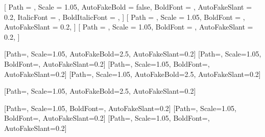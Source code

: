 \setCJKmainfont{\MySongTi}[
    Path = \fontdir,
    Scale = 1.05,
    AutoFakeBold = false,
    BoldFont = \MySongTiBold,
    AutoFakeSlant = 0.2,
    ItalicFont = \MyKaiTi,
    BoldItalicFont = \MyKaiTi,
]
\setCJKsansfont{\MyHeiTi}[
    Path = \fontdir,
    Scale = 1.05,
    BoldFont = \MyHeiTiBold,
    AutoFakeSlant = 0.2,
]
\setCJKmonofont{\MyHeiTi}[
    Path = \fontdir,
    Scale = 1.05,
    BoldFont = \MyHeiTiBold,
    AutoFakeSlant = 0.2,
]

\newCJKfontfamily\kaishu{\MyKaiTi}[Path=\fontdir, Scale=1.05, AutoFakeBold=2.5, AutoFakeSlant=0.2]
\newCJKfontfamily\songti{\MySongTi}[Path=\fontdir, Scale=1.05, BoldFont=\MySongTiBold, AutoFakeSlant=0.2]
\newCJKfontfamily\heiti{\MyHeiTi}[Path=\fontdir, Scale=1.05, BoldFont=\MyHeiTiBold, AutoFakeSlant=0.2]
\newCJKfontfamily\fangsong{\MyFangSong}[Path=\fontdir, Scale=1.05, AutoFakeBold=2.5, AutoFakeSlant=0.2]

\newCJKfontfamily{}[Path=\fontdir, Scale=1.05, AutoFakeBold=2.5, AutoFakeSlant=0.2]

\newcommand\thmheiti{\heiti}

[Path=\fontdir, Scale=1.05, BoldFont=\MyHeiTiBold, AutoFakeSlant=0.2]
\newcommand{\heiTwo}{\CJKfamily{hei2}}
[Path=\fontdir, Scale=1.05, BoldFont=\MyHeiTiBold, AutoFakeSlant=0.2]
\newCJKfontfamily\pffont{\MySongTi}[Path=\fontdir, Scale=1.05, BoldFont=\MySongTiBold, AutoFakeSlant=0.2]



